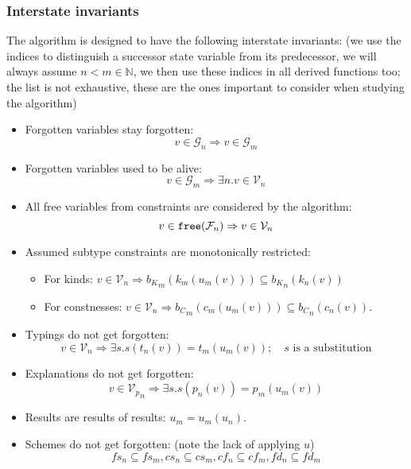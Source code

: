 \subsubsection{Interstate invariants}

The algorithm is designed to have the following interstate invariants: (we use the indices to distinguish a successor state variable from its predecessor, we will always assume $n < m \in \mathbb{N}$, we then use these indices in all derived functions too; the list is not exhaustive, these are the ones important to consider when studying the algorithm)

\begin{itemize}
    \item Forgotten variables stay forgotten:
    $$v \in \mathcal{G}_n \Rightarrow v \in \mathcal{G}_m$$

    \item Forgotten variables used to be alive:
    $$v \in \mathcal{G}_m \Rightarrow \exists n . v \in \mathcal{V}_n$$

    \item All free variables from constraints are considered by the algorithm:
    $$v \in \mathtt{free} (\mathcal{F}_n) \Rightarrow v \in \mathcal{V}_n$$

    \item Assumed subtype constraints are monotonically restricted: \quad
    \begin{itemize}
        \item For kinds: $v \in {\mathcal{V}}_n \Rightarrow {b_K}_m (k_m(u_m(v))) \subseteq {b_K}_n (k_n(v))$
        \item For constnesses: $v \in {\mathcal{V}}_n \Rightarrow {b_C}_m (c_m(u_m(v))) \subseteq {b_C}_n (c_n(v))$.
    \end{itemize}

    \item Typings do not get forgotten:
    $$v \in {\mathcal{V}}_n \Rightarrow \exists s . s (t_n(v)) = t_m(u_m (v));\quad s \text{ is a substitution}$$

    \item Explanations do not get forgotten:
    $$v \in {\mathcal{V}_p}_n \Rightarrow \exists s . s(p_n(v)) = p_m(u_m (v))$$

    \item Results are results of results: $u_m = u_m (u_n)$.

    \item Schemes do not get forgotten: (note the lack of applying $u$)
    $$fs_n \subseteq fs_m, cs_n \subseteq cs_m, cf_n \subseteq  cf_m, fd_n \subseteq  fd_m$$
\end{itemize}

